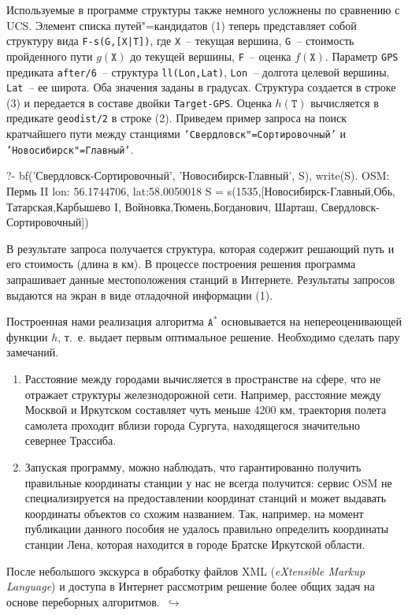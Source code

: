 \documentclass[a4paper,14pt, openany, twoside, final]{extbook} %
\newcommand{\eeng}[1]{\emph{\foreignlanguage{english}{#1}}}
\newcommand{\aaa}[2][acolor]{\noindent\textcolor{eclr}%
{+\ [}\textcolor{#1}{#2}\textcolor{eclr}{]}}
\newcommand{\goforth}[1]{$\,\hookrightarrow$\pageref{#1}}
\begin{document}
Используемые в программе структуры также немного усложнены по сравнению с UCS.  Элемент списка путей"=кандидатов (1) теперь представляет собой структуру вида \texttt{F-s(G,[X|T])}, где \texttt{X}~-- текущая вершина, \texttt{G}~-- стоимость пройденного пути $g(\mathtt{X})$ до текущей вершины, \texttt{F}~-- оценка $f(\mathtt{X})$.  Параметр \texttt{GPS} предиката \texttt{after/6}~-- структура \texttt{ll(Lon,Lat)}, \texttt{Lon}~-- долгота целевой вершины, \texttt{Lat}~-- ее широта.   Оба значения заданы в градусах.  Структура создается в строке (3) и передается в составе двойки \texttt{Target-GPS}.  Оценка $h(\mathtt{T})$ вычисляется в предикате \texttt{geodist/2} в строке (2).  Приведем пример запроса на поиск кратчайшего пути между станциями \texttt{'Свердловск"=Сортировочный'} и \texttt{'Новосибирск"=Главный'}.

\begin{proexp}
?- bf('Свердловск-Сортировочный',
   'Новосибирск-Главный', S), write(S).
OSM: Пермь II
    lon: 56.1744706, lat:58.0050018    %
S = s(1535,[Новосибирск-Главный,Обь, Татарская,Карбышево I,
    Войновка,Тюмень,Богданович, Шарташ,
    Свердловск-Сортировочный])
\end{proexp}

В результате запроса получается структура, которая содержит решающий путь и его стоимость (длина в км).  В процессе построения решения программа запрашивает данные местоположения станций в Интернете.  Результаты запросов выдаются на экран в виде отладочной информации (1).


Построенная нами реализация алгоритма $\mathtt{A}^*$ основывается на непереоценивающей функции $h$, т.~е. выдает первым оптимальное решение.  Необходимо сделать пару замечаний.
\begin{enumerate}
\item Расстояние между городами вычисляется в пространстве на сфере, что не отражает структуры железнодорожной сети.  Например, расстояние между Москвой и Иркутском составляет чуть меньше 4200 км,  траектория полета самолета проходит вблизи города Сургута, находящегося значительно севернее Трассиба.
\item Запуская программу, можно наблюдать, что гарантированно получить правильные координаты станции у нас не всегда получится: сервис OSM не специализируется на предоставлении координат станций и может выдавать координаты объектов со схожим названием.  Так, например, на момент публикации данного пособия не удалось правильно определить координаты станции Лена, которая находится в городе Братске Иркутской области.
\end{enumerate}
После небольшого экскурса в обработку файлов XML (\eeng{eXtensible Markup Language}) и доступа в Интернет рассмотрим решение более общих задач на основе переборных алгоритмов.  \goforth{sec:britmuseum}
\end{document}
